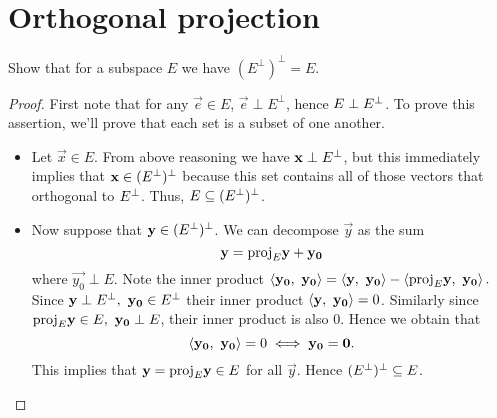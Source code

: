 \section{Orthogonal projection}
\setcounter{exercise}{11}
\begin{exercise}
  Show that for a subspace $E$ we have $(E^\perp)^\perp=E$.
\end{exercise}
\begin{proof}
  First note that for any $\vec{e}\in E$, $\vec{e}\perp E^\perp$, hence
  $E\perp E\perc$. To prove this assertion, we'll prove that each set is
  a subset of one another.
  \begin{itemize}
    \item Let $\vec{x}\in E$. From above reasoning we have 
      $\vec{x}\perp E\perc$, but this immediately implies that 
      $\vec{x}\in(E\perc)\perc$ because this set contains all of those 
      vectors that orthogonal to $E\perc$. Thus, 
      $E\subseteq (E\perc)\perc$.
    \item Now suppose that $\vec{y}\in (E\perc)\perc$. We can decompose 
      $\vec{y}$ as the sum
      \[\vec{y}=\proj{\vec{y}}{E}+\vec{y_0}\]
      where $\vec{y_0}\perp E$. Note the inner product
      $
        \ang{\vec{y_0,~\vec{y_0}}}=
        \ang{\vec{y},~\vec{y_0}}-\ang{\proj{\vec{y}}{E},~ \vec{y_0}}.
      $
      Since $\vec{y}\perp E\perc,~\vec{y_0}\in E\perc$ their inner product
      $\ang{\vec{y},~\vec{y_0}}=0$. Similarly since 
      $\proj{\vec{y}}{E}\in E,~ \vec{y_0}\perp E$, their inner product
      is also $0$. Hence we obtain that
      \[\ang{\vec{y_0},~\vec{y_0}}=0\iff \vec{y_0}=\vec{0}.\]
      This implies that $\vec{y}=\proj{\vec{y}}{E}\in E$ for all 
      $\vec{y}$. Hence $(E\perc)\perc\subseteq E$.
  \end{itemize}
\end{proof}
\newpage
